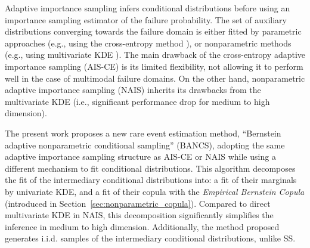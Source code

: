 Adaptive importance sampling infers conditional distributions before using an importance sampling estimator of the failure probability. 
The set of auxiliary distributions converging towards the failure domain is either fitted by parametric approaches (e.g., using the cross-entropy method \citealt{rubinstein_2004_CE}), or nonparametric methods (e.g., using multivariate KDE \citealt{Morio_RESS_2011}). 
The main drawback of the cross-entropy adaptive importance sampling (AIS-CE) is its limited flexibility, not allowing it to perform well in the case of multimodal failure domains. 
On the other hand, nonparametric adaptive importance sampling (NAIS) inherits its drawbacks from the multivariate KDE (i.e., significant performance drop for medium to high dimension). 


The present work proposes a new rare event estimation method, ``Bernstein adaptive nonparametric conditional sampling'' (BANCS), adopting the same adaptive importance sampling structure as AIS-CE or NAIS while using a different mechanism to fit conditional distributions. 
This algorithm decomposes the fit of the intermediary conditional distributions into: a fit of their marginals by univariate KDE, and a fit of their copula with the \emph{Empirical Bernstein Copula} (introduced in Section~\ref{sec:nonparametric_copula}). 
Compared to direct multivariate KDE in NAIS, this decomposition significantly simplifies the inference in medium to high dimension. 
Additionally, the method proposed generates i.i.d. samples of the intermediary conditional distributions, unlike SS. 

